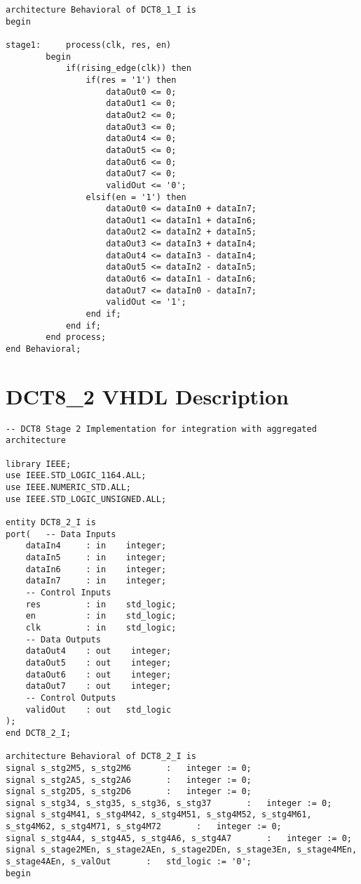\begin{appendices}
\begin{lstlisting}[style=vhdl]
architecture Behavioral of DCT8_1_I is
begin

stage1:     process(clk, res, en)
        begin
            if(rising_edge(clk)) then
                if(res = '1') then
                    dataOut0 <= 0;
                    dataOut1 <= 0;
                    dataOut2 <= 0;
                    dataOut3 <= 0;
                    dataOut4 <= 0;
                    dataOut5 <= 0;
                    dataOut6 <= 0;
                    dataOut7 <= 0;
                    validOut <= '0';
                elsif(en = '1') then
                    dataOut0 <= dataIn0 + dataIn7;
                    dataOut1 <= dataIn1 + dataIn6;
                    dataOut2 <= dataIn2 + dataIn5;
                    dataOut3 <= dataIn3 + dataIn4;
                    dataOut4 <= dataIn3 - dataIn4;
                    dataOut5 <= dataIn2 - dataIn5;
                    dataOut6 <= dataIn1 - dataIn6;
                    dataOut7 <= dataIn0 - dataIn7;
                    validOut <= '1';
                end if;
            end if;
        end process;
end Behavioral;
\end{lstlisting}

\section{DCT8\_2 VHDL Description} \label{app:dct82}
\begin{lstlisting}[style=vhdl]
-- DCT8 Stage 2 Implementation for integration with aggregated architecture

library IEEE;
use IEEE.STD_LOGIC_1164.ALL;
use IEEE.NUMERIC_STD.ALL;
use IEEE.STD_LOGIC_UNSIGNED.ALL;

entity DCT8_2_I is
port(   -- Data Inputs
    dataIn4     : in    integer;
    dataIn5     : in    integer;
    dataIn6     : in    integer;
    dataIn7     : in    integer;
    -- Control Inputs
    res         : in    std_logic;
    en          : in    std_logic;
    clk         : in    std_logic;
    -- Data Outputs
    dataOut4    : out    integer;
    dataOut5    : out    integer;
    dataOut6    : out    integer;
    dataOut7    : out    integer;
    -- Control Outputs
    validOut    : out   std_logic
);
end DCT8_2_I;

architecture Behavioral of DCT8_2_I is
signal s_stg2M5, s_stg2M6       :   integer := 0;
signal s_stg2A5, s_stg2A6       :   integer := 0;
signal s_stg2D5, s_stg2D6       :   integer := 0;
signal s_stg34, s_stg35, s_stg36, s_stg37       :   integer := 0;
signal s_stg4M41, s_stg4M42, s_stg4M51, s_stg4M52, s_stg4M61, s_stg4M62, s_stg4M71, s_stg4M72       :   integer := 0;
signal s_stg4A4, s_stg4A5, s_stg4A6, s_stg4A7       :   integer := 0;
signal s_stage2MEn, s_stage2AEn, s_stage2DEn, s_stage3En, s_stage4MEn, s_stage4AEn, s_valOut       :   std_logic := '0';
begin


\end{lstlisting}
\end{appendices}

